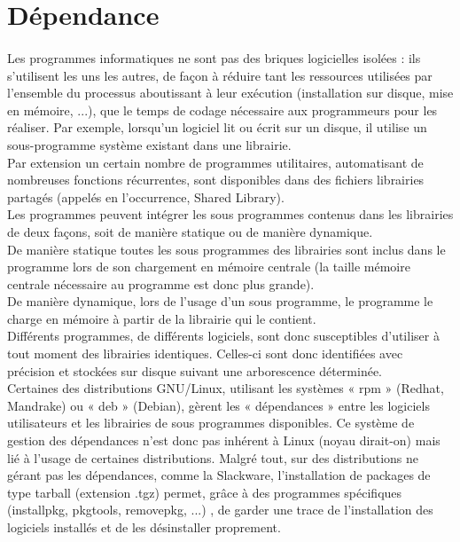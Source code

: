 \documentclass[a4paper,12pt]{article}
\begin{document}
\clearpage



\section{Dépendance}
\paragraph{}
Les programmes informatiques ne sont pas des briques logicielles isolées : ils s’utilisent les uns les autres, de façon
à réduire tant les ressources utilisées par l’ensemble du processus aboutissant à leur exécution (installation sur disque, mise en mémoire, ...), 
que le temps de codage nécessaire aux programmeurs pour les réaliser. Par exemple, lorsqu’un logiciel lit ou écrit sur un disque, 
il utilise un sous-programme système existant dans une librairie.\\

Par extension un certain nombre de programmes utilitaires, automatisant de nombreuses fonctions récurrentes, 
sont disponibles dans des fichiers librairies partagés (appelés en l’occurrence, Shared Library).\\

Les programmes peuvent intégrer les sous programmes contenus dans les librairies de deux façons, soit de manière statique ou de manière dynamique.\\

De manière statique toutes les sous programmes des librairies sont inclus dans le programme lors de son chargement en mémoire centrale 
(la taille mémoire centrale nécessaire au programme est donc plus grande).\\

De manière dynamique, lors de l’usage d’un sous programme, le programme le charge en mémoire à partir de la librairie qui le contient.\\

Différents programmes, de différents logiciels, sont donc susceptibles d’utiliser à tout moment des librairies identiques. 
Celles-ci sont donc identifiées avec précision  et stockées sur disque suivant une arborescence déterminée.\\

Certaines des distributions GNU/Linux, utilisant les systèmes « rpm » (Redhat, Mandrake) ou « deb » (Debian), gèrent 
les « dépendances » entre les logiciels utilisateurs et les librairies de sous programmes disponibles. 
Ce système de gestion des dépendances n’est donc pas inhérent à Linux (noyau dirait-on) mais lié à l’usage de certaines distributions. 
Malgré tout, sur des distributions ne gérant pas les dépendances, comme la Slackware, l’installation de packages de type tarball (extension .tgz)
permet, grâce à des programmes spécifiques (installpkg, pkgtools, removepkg, ...) , de garder une trace de l’installation des logiciels installés 
et de les désinstaller proprement.\\
\end{document}
